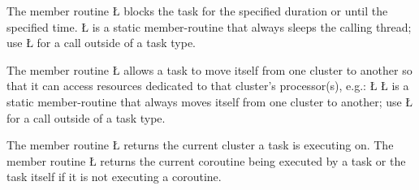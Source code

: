 \documentclass[openright,twoside]{report}
\begin{document}
The member routine \LGinlinetrue\LGbegin\lgrinde\L{}\endlgrinde\LGend{} blocks the task for the specified duration or until the specified time.
\LGinlinetrue\LGbegin\lgrinde\L{}\endlgrinde\LGend{} is a static member-routine that always sleeps the calling thread;
use \LGinlinetrue\LGbegin\lgrinde\L{}\endlgrinde\LGend{} for a call outside of a task type.

The member routine \LGinlinetrue\LGbegin\lgrinde\L{}\endlgrinde\LGend{} allows a task to move itself from one cluster to another so that it can access resources dedicated to that cluster's processor(s), e.g.:
\LGinlinefalse\LGbegin\lgrinde
\L{}
\endlgrinde\LGend
\LGinlinetrue\LGbegin\lgrinde\L{}\endlgrinde\LGend{} is a static member-routine that always moves itself from one cluster to another;
use \LGinlinetrue\LGbegin\lgrinde\L{}\endlgrinde\LGend{} for a call outside of a task type.

The member routine \LGinlinetrue\LGbegin\lgrinde\L{}\endlgrinde\LGend{} returns the current cluster a task is executing on.
The member routine \LGinlinetrue\LGbegin\lgrinde\L{}\endlgrinde\LGend{} returns the current coroutine being executed by a task or the task itself if it is not executing a coroutine.
\end{document}
